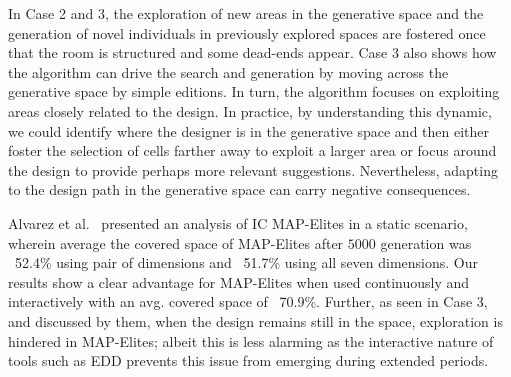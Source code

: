 
In Case 2 and 3, the exploration of new areas in the generative space and the generation of novel individuals in previously explored spaces are fostered once that the room is structured and some dead-ends appear. Case 3 also shows how the algorithm can drive the search and generation by moving across the generative space by simple editions. In turn, the algorithm focuses on exploiting areas closely related to the design. In practice, by understanding this dynamic, we could identify where the designer is in the generative space and then either foster the selection of cells farther away to exploit a larger area or focus around the design to provide perhaps more relevant suggestions. Nevertheless, adapting to the design path in the generative space can carry negative consequences. 

Alvarez et al.~ presented an analysis of IC MAP-Elites in a static scenario, wherein average the covered space of MAP-Elites after $5000$ generation was ~52.4\% using pair of dimensions and ~51.7\% using all seven dimensions. Our results show a clear advantage for MAP-Elites when used continuously and interactively with an avg. covered space of ~70.9\%. Further, as seen in Case 3, and discussed by them, when the design remains still in the space, exploration is hindered in MAP-Elites; albeit this is less alarming as the interactive nature of tools such as EDD prevents this issue from emerging during extended periods.




